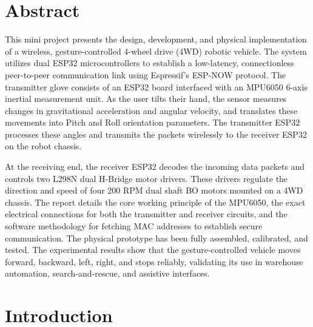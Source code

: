 \documentclass[12pt,a4paper,oneside]{report}
\begin{document}
\chapter*{Abstract}
\vspace{0.2in}
This mini project presents the design, development, and physical implementation of a wireless, gesture-controlled 4-wheel drive (4WD) robotic vehicle. The system utilizes dual ESP32 microcontrollers to establish a low-latency, connectionless peer-to-peer communication link using Espressif's ESP-NOW protocol. The transmitter glove consists of an ESP32 board interfaced with an MPU6050 6-axis inertial measurement unit. As the user tilts their hand, the sensor measures changes in gravitational acceleration and angular velocity, and translates these movements into Pitch and Roll orientation parameters. The transmitter ESP32 processes these angles and transmits the packets wirelessly to the receiver ESP32 on the robot chassis.\par
\medskip
At the receiving end, the receiver ESP32 decodes the incoming data packets and controls two L298N dual H-Bridge motor drivers. These drivers regulate the direction and speed of four 200 RPM dual shaft BO motors mounted on a 4WD chassis. The report details the core working principle of the MPU6050, the exact electrical connections for both the transmitter and receiver circuits, and the software methodology for fetching MAC addresses to establish secure communication. The physical prototype has been fully assembled, calibrated, and tested. The experimental results show that the gesture-controlled vehicle moves forward, backward, left, right, and stops reliably, validating its use in warehouse automation, search-and-rescue, and assistive interfaces.\par
\clearpage


\chapter{Introduction}
\end{document}
